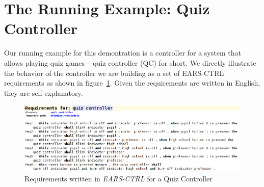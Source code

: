 \vspace{-.5cm}
\section{The Running Example: Quiz Controller}
\label{sec:example}
\vspace{-.3cm}
Our running example for this demontration is a controller for a system that
allows playing quiz games -- quiz controller (QC) for short. We directly
illustrate the behavior of the controller we are building as a set of
\textsf{EARS-CTRL} requirements as shown in figure~\ref{fig:QC_reqs}. Given the
requirements are written in English, they are self-explanatory.
\begin{figure}[!h]
\centering
\includegraphics[width=1\textwidth]{./images/QC_Reqs.png}
\caption{Requirements written in \emph{EARS-CTRL} for a Quiz Controller}
\label{fig:QC_reqs}
\end{figure}
